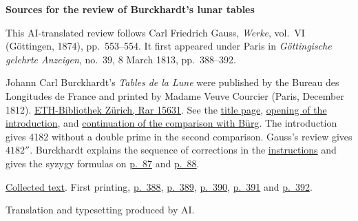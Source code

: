 \clearpage\thispagestyle{empty}
\begin{center}\textbf{Sources for the review of Burckhardt's lunar tables}\end{center}
\noindent This AI-translated review follows Carl Friedrich Gauss, \textit{Werke}, vol.~VI (Göttingen, 1874), pp.~553--554. It first appeared under Paris in \textit{Göttingische gelehrte Anzeigen}, no.~39, 8 March 1813, pp.~388--392.
\par\smallskip\noindent Johann Carl Burckhardt's \textit{Tables de la Lune} were published by the Bureau des Longitudes de France and printed by Madame Veuve Courcier (Paris, December 1812). \href{https://www.e-rara.ch/zut/content/titleinfo/21914185}{ETH-Bibliothek Zürich, Rar 15631}. See the \href{https://www.e-rara.ch/i3f/v20/21914186/full/1650,/0/default.jpg}{title page}, \href{https://www.e-rara.ch/i3f/v20/21914188/full/1650,/0/default.jpg}{opening of the introduction}, and \href{https://www.e-rara.ch/i3f/v20/21914190/full/1650,/0/default.jpg}{continuation of the comparison with Bürg}. The introduction gives 4182 without a double prime in the second comparison. Gauss's review gives \(4182''\). Burckhardt explains the sequence of corrections in the \href{https://www.e-rara.ch/i3f/v20/21914193/full/1650,/0/default.jpg}{instructions} and gives the syzygy formulas on \href{https://www.e-rara.ch/i3f/v20/21914281/full/1650,/0/default.jpg}{p.~87} and \href{https://www.e-rara.ch/i3f/v20/21914282/full/1650,/0/default.jpg}{p.~88}.
\par\smallskip\noindent \href{https://gdz.sub.uni-goettingen.de/id/PPN236007467}{Collected text}. First printing, \href{https://images.p.sub.uni-goettingen.de/iiif/image/gdz:PPN319721507_1813:00000390/full/1650,/0/default.jpg}{p.~388}, \href{https://images.p.sub.uni-goettingen.de/iiif/image/gdz:PPN319721507_1813:00000391/full/1650,/0/default.jpg}{p.~389}, \href{https://images.p.sub.uni-goettingen.de/iiif/image/gdz:PPN319721507_1813:00000392/full/1650,/0/default.jpg}{p.~390}, \href{https://images.p.sub.uni-goettingen.de/iiif/image/gdz:PPN319721507_1813:00000393/full/1650,/0/default.jpg}{p.~391} and \href{https://images.p.sub.uni-goettingen.de/iiif/image/gdz:PPN319721507_1813:00000394/full/1650,/0/default.jpg}{p.~392}.
\par\smallskip\noindent Translation and typesetting produced by AI.
\clearpage
